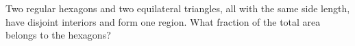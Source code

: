 Two regular hexagons and two equilateral triangles, all with the same side length, have disjoint interiors and form one region. What fraction of the total area belongs to the hexagons?
